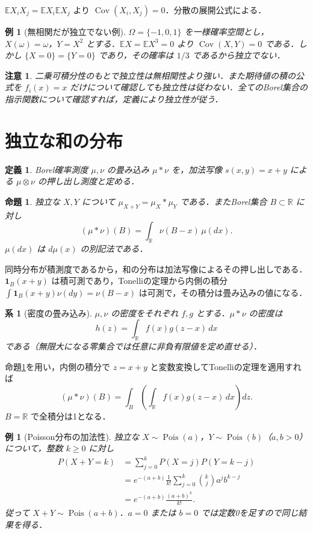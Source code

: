 \documentclass[a5paper,10pt,onecolumn]{jsarticle}
\makeatletter
\theoremstyle{mathnotetheorem}
\newtheorem{definition}[theorem]{定義}
\newtheorem{proposition}[theorem]{命題}
\newtheorem{corollary}[theorem]{系}
\newtheorem{example}[theorem]{例}
\newtheorem{remark}[theorem]{注意}
\renewcommand{\proofname}{証明}
\renewenvironment{proof}[1][\proofname]{%
  \par\pushQED{\qed}\normalfont\topsep4\p@\@plus2\p@\relax
  \trivlist\item[\hskip\labelsep\bfseries #1]\ignorespaces
}{\popQED\endtrivlist\@endpefalse}
\newcommand{\R}{\mathbb{R}}
\newcommand{\E}{\mathbb E}
\newcommand{\1}{\mathbf{1}}
\DeclareMathOperator{\Cov}{Cov}
\makeatother
\begin{document}
\begin{proof}
$\E X_iX_j=\E X_i\E X_j$ より $\Cov(X_i,X_j)=0$．分散の展開公式による．
\end{proof}
\begin{example}[無相関だが独立でない例]
$\Omega=\{-1,0,1\}$ を一様確率空間とし，$X(\omega)=\omega$，$Y=X^2$ とする．$\E X=\E X^3=0$ より $\Cov(X,Y)=0$ である．しかし $\{X=0\}=\{Y=0\}$ であり，その確率は $1/3$ であるから独立でない．
\end{example}
\begin{remark}
二乗可積分性のもとで独立性は無相関性より強い．また期待値の積の公式を $f_i(x)=x$ だけについて確認しても独立性は従わない．全てのBorel集合の指示関数について確認すれば，定義により独立性が従う．
\end{remark}

\section{独立な和の分布}
\begin{definition}
Borel確率測度 $\mu,\nu$ の畳み込み $\mu*\nu$ を，加法写像 $s(x,y)=x+y$ による $\mu\otimes\nu$ の押し出し測度と定める．
\end{definition}
\begin{proposition}\label{conv}
独立な $X,Y$ について $\mu_{X+Y}=\mu_X*\mu_Y$ である．またBorel集合 $B\subset\R$ に対し
\[
 (\mu*\nu)(B)=\int_\R\nu(B-x)\,\mu(dx).
\]
$\mu(dx)$ は $d\mu(x)$ の別記法である．
\end{proposition}
\begin{proof}
同時分布が積測度であるから，和の分布は加法写像によるその押し出しである．$\1_B(x+y)$ は積可測であり，Tonelliの定理から内側の積分 $\int\1_B(x+y)\nu(dy)=\nu(B-x)$ は可測で，その積分は畳み込みの値になる．
\end{proof}
\begin{corollary}[密度の畳み込み]
$\mu,\nu$ の密度をそれぞれ $f,g$ とする．$\mu*\nu$ の密度は
\[
 h(z)=\int_\R f(x)g(z-x)\,dx
\]
である（無限大になる零集合では任意に非負有限値を定め直せる）．
\end{corollary}
\begin{proof}
命題\ref{conv}を用い，内側の積分で $z=x+y$ と変数変換してTonelliの定理を適用すれば
\[
 (\mu*\nu)(B)=\int_B\left(\int_\R f(x)g(z-x)\,dx\right)dz.
\]
$B=\R$ で全積分は1となる．
\end{proof}
\begin{example}[Poisson分布の加法性]
独立な $X\sim\operatorname{Pois}(a)$，$Y\sim\operatorname{Pois}(b)$（$a,b>0$）について，整数 $k\ge0$ に対し
\begin{align*}
 P(X+Y=k)&=\sum_{j=0}^kP(X=j)P(Y=k-j)\\
 &=e^{-(a+b)}\frac1{k!}\sum_{j=0}^k\binom kj a^jb^{k-j}\\
 &=e^{-(a+b)}\frac{(a+b)^k}{k!}.
\end{align*}
従って $X+Y\sim\operatorname{Pois}(a+b)$．$a=0$ または $b=0$ では定数0を足すので同じ結果を得る．
\end{example}
\end{document}
